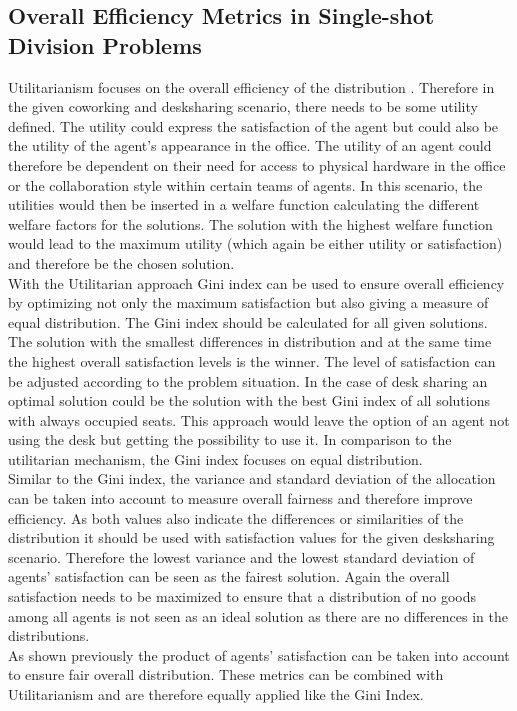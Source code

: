 \documentclass[german, a4paper, 11pt, oneside]{scrbook}
\begin{document}
\subsection{Overall Efficiency Metrics in Single-shot Division Problems}
Utilitarianism focuses on the overall efficiency of the distribution \cite{Brandt}. Therefore in the given coworking and desksharing scenario, there needs to be some utility defined. The utility could express the satisfaction of the agent but could also be the utility of the agent's appearance in the office. The utility of an agent could therefore be dependent on their need for access to physical hardware in the office or the collaboration style within certain teams of agents. In this scenario, the utilities would then be inserted in a welfare function calculating the different welfare factors for the solutions. The solution with the highest welfare function would lead to the maximum utility (which again be either utility or satisfaction) and therefore be the chosen solution. \\With the Utilitarian approach Gini index can be used to ensure overall efficiency by optimizing not only the maximum satisfaction but also giving a measure of equal distribution. The Gini index should be calculated for all given solutions. The solution with the smallest differences in distribution and at the same time the highest overall satisfaction levels is the winner. The level of satisfaction can be adjusted according to the problem situation. In the case of desk sharing an optimal solution could be the solution with the best Gini index of all solutions with always occupied seats. This approach would leave the option of an agent not using the desk but getting the possibility to use it. In comparison to the utilitarian mechanism, the Gini index focuses on equal distribution.
\\Similar to the Gini index, the variance and standard deviation of the allocation can be taken into account to measure overall fairness and therefore improve efficiency. As both values also indicate the differences or similarities of the distribution it should be used with satisfaction values for the given desksharing scenario. Therefore the lowest variance and the lowest standard deviation of agents' satisfaction can be seen as the fairest solution. Again the overall satisfaction needs to be maximized to ensure that a distribution of no goods among all agents is not seen as an ideal solution as there are no differences in the distributions.
\\ As shown previously the product of agents' satisfaction can be taken into account to ensure fair overall distribution. These metrics can be combined with Utilitarianism and are therefore equally applied like the Gini Index.
\end{document}
